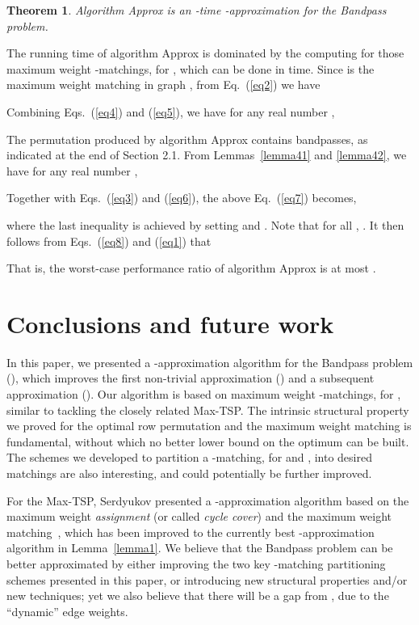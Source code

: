 \documentclass[11pt,twoside]{article}\usepackage{amssymb,latexsym,graphicx,hyperref}\usepackage{epstopdf}
\newtheorem{theorem}{Theorem}\newtheorem{lemma}{Lemma}
\newenvironment{proof}{{\sc Proof. }}{\hfill\vspace{0.2in}}
\begin{document}
\begin{theorem}
\label{theorem1}
Algorithm {\sc Approx} is an -time -approximation for the Bandpass problem.
\end{theorem}
\begin{proof}
The running time of algorithm {\sc Approx} is dominated by the computing for those maximum weight -matchings, for ,
which can be done in  time.
Since  is the maximum weight matching in graph , from Eq.~(\ref{eq2}) we have



Combining Eqs.~(\ref{eq4}) and (\ref{eq5}), we have for any real number ,



The permutation  produced by algorithm {\sc Approx} contains  bandpasses, as indicated at the end of Section 2.1.
From Lemmas~\ref{lemma41} and \ref{lemma42}, we have for any real number ,



Together with Eqs.~(\ref{eq3}) and (\ref{eq6}), the above Eq.~(\ref{eq7}) becomes,

where the last inequality is achieved by setting  and .
Note that for all , .
It then follows from Eqs.~(\ref{eq8}) and (\ref{eq1}) that


That is, the worst-case performance ratio of algorithm {\sc Approx} is at most .
\end{proof}


\section{Conclusions and future work}
In this paper, we presented a -approximation algorithm for the Bandpass problem (),
which improves the first non-trivial approximation () and a subsequent approximation ().
Our algorithm is based on maximum weight -matchings, for , similar to tackling the closely related Max-TSP.
The intrinsic structural property we proved for the optimal row permutation and the maximum weight matching is fundamental,
without which no better lower bound on the optimum can be built.
The schemes we developed to partition a -matching, for  and , into desired matchings are also interesting,
and could potentially be further improved.


For the Max-TSP, Serdyukov presented a -approximation algorithm based on
the maximum weight {\em assignment} (or called {\em cycle cover}) and the maximum weight matching~\cite{Ser84},
which has been improved to the currently best -approximation algorithm in Lemma~\ref{lemma1}.
We believe that the Bandpass problem can be better approximated by
either improving the two key -matching partitioning schemes presented in this paper,
or introducing new structural properties and/or new techniques;
yet we also believe that there will be a gap from , due to the ``dynamic'' edge weights.
\end{document}
